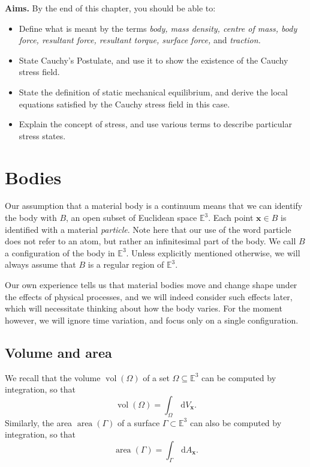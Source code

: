 \documentclass[
  letterpaper,
  DIV=11,
  numbers=noendperiod]{scrreprt}
\theoremstyle{plain}
\theoremstyle{remark}
\begin{document}
\textbf{Aims.} By the end of this chapter, you should be able to:

\begin{itemize}
\item
  Define what is meant by the terms \emph{body, mass density, centre of
  mass, body force, resultant force, resultant torque, surface force,}
  and \emph{traction.}
\item
  State Cauchy's Postulate, and use it to show the existence of the
  Cauchy stress field.
\item
  State the definition of static mechanical equilibrium, and derive the
  local equations satisfied by the Cauchy stress field in this case.
\item
  Explain the concept of stress, and use various terms to describe
  particular stress states.
\end{itemize}

\section{Bodies}\label{bodies}

Our assumption that a material body is a continuum means that we can
identify the body with \(B\), an open subset of Euclidean space
\({\mathbb{E}}^3\). Each point \({\boldsymbol{x}}\in B\) is identified
with a material \emph{particle}. Note here that our use of the word
particle does not refer to an atom, but rather an infinitesimal part of
the body. We call \(B\) a configuration of the body in
\({\mathbb{E}}^3\). Unless explicitly mentioned otherwise, we will
always assume that \(B\) is a regular region of \({\mathbb{E}}^3\).

Our own experience tells us that material bodies move and change shape
under the effects of physical processes, and we will indeed consider
such effects later, which will necessitate thinking about how the body
varies. For the moment however, we will ignore time variation, and focus
only on a single configuration.

\subsection{Volume and area}\label{volume-and-area}

We recall that the volume \({\operatorname{vol}}(\Omega)\) of a set
\(\Omega\subseteq{\mathbb{E}}^3\) can be computed by integration, so
that
\[{\operatorname{vol}}(\Omega) = \int_\Omega {\,{\mathrm{d}}V_{{\boldsymbol{x}}}}.\]
Similarly, the area \({\operatorname{area}}(\Gamma)\) of a surface
\(\Gamma\subset{\mathbb{E}}^3\) can also be computed by integration, so
that
\[{\operatorname{area}}(\Gamma) = \int_\Gamma {\,{\mathrm{d}}A_{{\boldsymbol{x}}}}.\]
\end{document}
